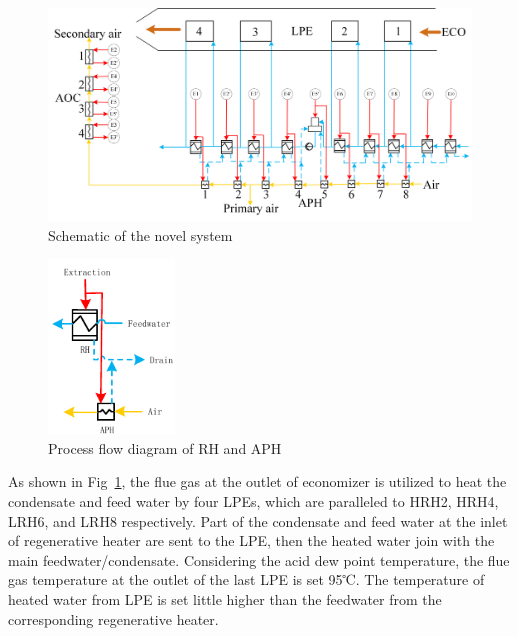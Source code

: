 \documentclass[preprint,12pt]{elsarticle}
\begin{document}
\begin{figure}[htbp]
\centering
\includegraphics[width=1\textwidth]{fig/novel_system.png}
\caption{Schematic of the novel system} 
\label{fig:novel_system}
\end{figure}

\begin{figure}[htbp]
\centering
\includegraphics[width=0.3\textwidth]{fig/extraction_heat_APH}%
\caption{Process flow diagram of RH and APH} 
\label{fig:extraction_heat_APH}
\end{figure}
As shown in Fig~\ref{fig:novel_system}, the flue gas at the outlet of economizer is utilized to heat the condensate and feed water by four LPEs, which are paralleled to HRH2, HRH4, LRH6, and LRH8 respectively. 
Part of the condensate and feed water at the inlet of regenerative heater are sent to the LPE, then the heated water join with the main feedwater/condensate. 
Considering the acid dew point temperature, the flue gas temperature at the outlet of the last LPE is set 95℃. 
The temperature of heated water from LPE is set little higher than the feedwater from the corresponding regenerative heater.%

\end{document}
